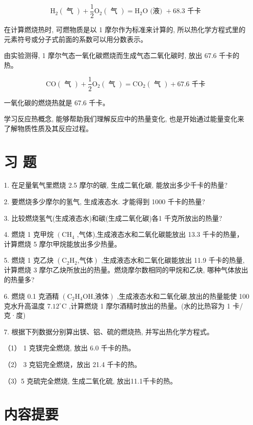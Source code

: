 \documentclass[10pt]{article}
\begin{document}
\[
{\mathrm{H}}_{2}\left( \text{ 气 }\right) + \frac{1}{2}{\mathrm{O}}_{2}\left( \text{ 气 }\right) = {\mathrm{H}}_{2}\mathrm{O}\text{ (液) } + {68.3}\text{ 千卡 }
\]

在计算燃烧热时, 可燃物质是以 1 摩尔作为标准来计算的, 所以热化学方程式里的元素符号或分子式前面的系数可以用分数表示。

由实验测得, 1 摩尔气态一氧化碳燃烧而生成气态二氧化碳时, 放出 67.6 千卡的热。

\[
\mathrm{{CO}}\left( \text{ 气 }\right) + \frac{1}{2}{\mathrm{O}}_{2}\left( \text{ 气 }\right) = {\mathrm{{CO}}}_{2}\left( \text{ 气 }\right) + {67.6}\text{ 千卡 }
\]

一氧化碳的燃烧热就是 67.6 千卡。

学习反应热概念, 能够帮助我们理解反应中的热量变化, 也是开始通过能量变化来了解物质性质及其反应过程。

\section*{习 题}

1. 在足量氧气里燃烧 2.5 摩尔的碳, 生成二氧化碳, 能放出多少千卡的热量?

2. 要燃烧多少摩尔的氢气, 生成液态水. 才能得到 1000 千卡的热量?

3. 比较燃烧氢气(生成液态水)和碳(生成二氧化碳)各1 千克所放出的热量?

4. 燃烧 1 克甲烷 \(\left( {\mathrm{{CH}}}_{4}\right.\) ,气体),生成液态水和二氧化碳能放出 13.3 千卡的热量，计算燃烧 5 摩尔甲烷能放出多少热量。

5. 燃烧 1 克乙炔 \(\left( {{\mathrm{C}}_{2}{\mathrm{H}}_{2}\text{,气体}}\right)\) ,生成液态水和二氧化碳能放出 11.9 千卡的热量, 计算燃烧 3 摩尔乙炔所放出的热量。燃烧摩尔数相同的甲烷和乙炔, 哪种气体放出的热量多?

6. 燃烧 0.1 克酒精 \(\left( {{\mathrm{C}}_{2}{\mathrm{H}}_{4}\mathrm{{OH}}\text{,液体}}\right)\) ,生成液态水和二氧化碳,放出的热量能使 100 克水升高温度 \({7.12}^{ \circ }\mathrm{C}\) ,计算燃烧 1 摩尔酒精时放出的热量。(水的比热容为 1 卡/克·度)

7. 根据下列数据分别算出镁、铝、硫的燃烧热, 并写出热化学方程式。

（1） 1 克镁完全燃烧, 放出 6.0 千卡的热。

（2） 3 克铝完全燃烧，放出 21.4 千卡的热。

（3）5 克硫完全燃烧, 生成二氧化硫, 放出11.1千卡的热。

\section*{内容提要}
\end{document}
